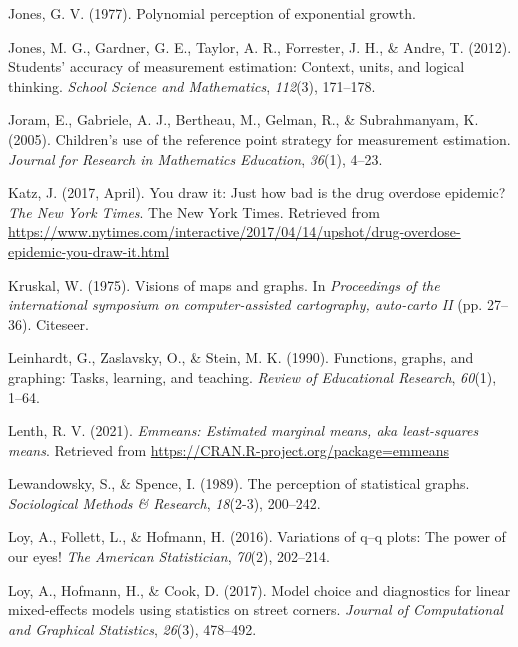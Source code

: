 \documentclass[print]{nuthesis}
\newlength{\cslhangindent}
\newenvironment{CSLReferences}[2]%
{\setlength{\parindent}{0pt}%
\everypar{\setlength{\hangindent}{\cslhangindent}}\ignorespaces}%
{\par}
\begin{document}
\begin{CSLReferences}{1}{0}
\leavevmode{}%
Jones, G. V. (1977). Polynomial perception of exponential growth.

\leavevmode{}%
Jones, M. G., Gardner, G. E., Taylor, A. R., Forrester, J. H., \& Andre, T. (2012). Students' accuracy of measurement estimation: Context, units, and logical thinking. \emph{School Science and Mathematics}, \emph{112}(3), 171--178.

\leavevmode{}%
Joram, E., Gabriele, A. J., Bertheau, M., Gelman, R., \& Subrahmanyam, K. (2005). Children's use of the reference point strategy for measurement estimation. \emph{Journal for Research in Mathematics Education}, \emph{36}(1), 4--23.

\leavevmode{}%
Katz, J. (2017, April). You draw it: Just how bad is the drug overdose epidemic? \emph{The New York Times}. The New York Times. Retrieved from \url{https://www.nytimes.com/interactive/2017/04/14/upshot/drug-overdose-epidemic-you-draw-it.html}

\leavevmode{}%
Kruskal, W. (1975). Visions of maps and graphs. In \emph{Proceedings of the international symposium on computer-assisted cartography, auto-carto II} (pp. 27--36). Citeseer.

\leavevmode{}%
Leinhardt, G., Zaslavsky, O., \& Stein, M. K. (1990). Functions, graphs, and graphing: Tasks, learning, and teaching. \emph{Review of Educational Research}, \emph{60}(1), 1--64.

\leavevmode{}%
Lenth, R. V. (2021). \emph{Emmeans: Estimated marginal means, aka least-squares means}. Retrieved from \url{https://CRAN.R-project.org/package=emmeans}

\leavevmode{}%
Lewandowsky, S., \& Spence, I. (1989). The perception of statistical graphs. \emph{Sociological Methods \& Research}, \emph{18}(2-3), 200--242.

\leavevmode{}%
Loy, A., Follett, L., \& Hofmann, H. (2016). Variations of q--q plots: The power of our eyes! \emph{The American Statistician}, \emph{70}(2), 202--214.

\leavevmode{}%
Loy, A., Hofmann, H., \& Cook, D. (2017). Model choice and diagnostics for linear mixed-effects models using statistics on street corners. \emph{Journal of Computational and Graphical Statistics}, \emph{26}(3), 478--492.


\end{CSLReferences}
\end{document}

